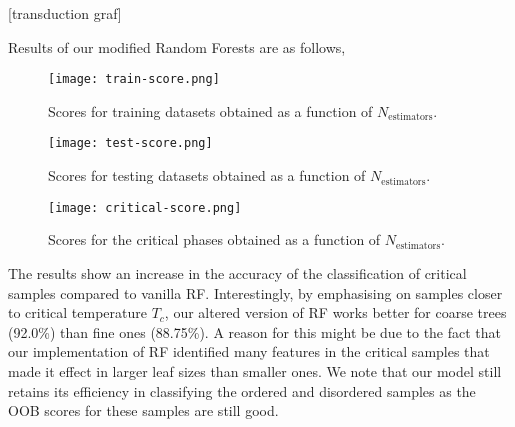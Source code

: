 [transduction graf]

Results of our modified Random Forests are as follows,

\begin{figure}[h!]
    \centering
    \texttt{[image: train-score.png]}
    \caption{Scores for training datasets obtained as a function of \( N_{\text{estimators}} \).}
\end{figure}

\begin{figure}[h!]
    \centering
    \texttt{[image: test-score.png]}
    \caption{Scores for testing datasets obtained as a function of \( N_{\text{estimators}} \).}
\end{figure}

\begin{figure}[h!]
    \centering
    \texttt{[image: critical-score.png]}
    \caption{Scores for the critical phases obtained as a function of \( N_{\text{estimators}} \).}
\end{figure}

The results show an increase in the accuracy of the classification of critical samples compared to vanilla RF. Interestingly, by emphasising on samples closer to critical temperature $T_c$, our altered version of RF works better
for coarse trees (92.0\%) than fine ones (88.75\%). A reason for this might be due to the fact that our implementation of RF identified many features in the critical samples that made it effect in larger leaf sizes than smaller ones. We note that our model still retains its efficiency in classifying the ordered and disordered samples as the OOB scores for these samples are still good.
